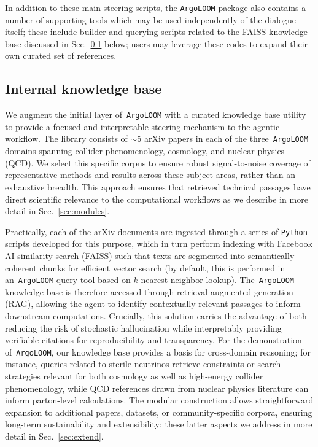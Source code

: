 \documentclass[final,3p,times,sort,compress]{elsarticle}
\newcommand{\AL}{\texttt{ArgoLOOM}\xspace}
\begin{document}
%
In addition to these main steering scripts, the \AL package also contains a number of supporting tools which may be used independently of the dialogue itself; these include builder and querying scripts related to the FAISS knowledge base discussed in Sec.~\ref{sec:knowledge} below; users may leverage these codes to expand their own curated set of references.
%
%

\subsection{Internal knowledge base}
\label{sec:knowledge}

We augment the initial layer of~\AL with a curated knowledge base utility to provide a focused and interpretable
steering mechanism to the agentic workflow.
%
The library consists of $\sim$5 arXiv papers in each of the three~\AL domains spanning collider
phenomenology, cosmology, and nuclear physics (QCD). We select this specific corpus to ensure robust signal-to-noise
coverage of representative methods and results across these subject areas, rather than an exhaustive breadth. This
approach ensures that retrieved technical passages have direct scientific relevance to the computational workflows
as we describe in more detail in Sec.~\ref{sec:modules}.

Practically, each of the arXiv documents are ingested through a series of \texttt{Python} scripts developed for this
purpose, which in turn perform indexing with Facebook AI similarity search (FAISS) such that texts are segmented into semantically coherent chunks for
efficient vector search (by default, this is performed in an~\AL query tool based on $k$-nearest neighbor lookup). The~\AL
knowledge base is therefore accessed through retrieval-augmented generation (RAG), allowing the agent to identify contextually
relevant passages to inform downstream computations. Crucially, this solution carries the advantage of both reducing the
risk of stochastic hallucination while interpretably providing verifiable citations for reproducibility and transparency.
%
For the demonstration of~\AL, our knowledge base provides a basis for cross-domain reasoning; for instance,
queries related to sterile neutrinos retrieve constraints or search strategies relevant for both cosmology as well as
high-energy collider phenomenology, while QCD references drawn from nuclear physics literature can inform parton-level
calculations. The modular construction allows straightforward expansion to additional papers, datasets, or
community-specific corpora, ensuring long-term sustainability and extensibility; these latter aspects we
address in more detail in Sec.~\ref{sec:extend}.
\end{document}
